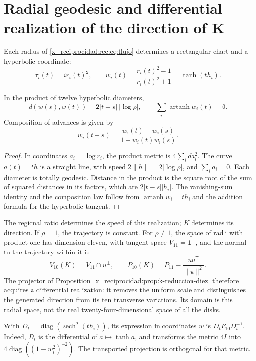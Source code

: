 \section{Radial geodesic and differential realization of the direction of K}

Each radius of \eqref{x_reciprocidad:rec:eq:flujo} determines a rectangular chart and a hyperbolic coordinate:
\[
 \tau_i(t)=ir_i(t)^2,\qquad
 w_i(t)=\frac{r_i(t)^2-1}{r_i(t)^2+1}=\tanh(th_i).
\]

\begin{theorem}
\label{x_reciprocidad:rec:thm:geodesica}
In the product of twelve hyperbolic diameters,
\begin{equation}
 d(w(s),w(t))=2|t-s|\,|\log\rho|,\qquad
 \sum_i\operatorname{artanh}w_i(t)=0.
 \label{x_reciprocidad:rec:eq:geodesica}
\end{equation}
Composition of advances is given by
\[
 w_i(t+s)=\frac{w_i(t)+w_i(s)}{1+w_i(t)w_i(s)}.
\]
\end{theorem}
\begin{proof}
In coordinates \(a_i=\log r_i\), the product metric is \(4\sum_i da_i^2\). The curve \(a(t)=th\) is a straight line, with speed \(2\|h\|=2|\log\rho|\), and \(\sum_i a_i=0\). Each diameter is totally geodesic. Distance in the product is the square root of the sum of squared distances in its factors, which are \(2|t-s||h_i|\). The vanishing-sum identity and the composition law follow from \(\operatorname{artanh}w_i=th_i\) and the addition formula for the hyperbolic tangent.
\end{proof}

The regional ratio determines the speed of this realization; \(K\) determines its direction. If \(\rho=1\), the trajectory is constant. For \(\rho\ne1\), the space of radii with product one has dimension eleven, with tangent space \(V_{11}=\mathbf1^\perp\), and the normal to the trajectory within it is
\[
 V_{10}(K)=V_{11}\cap u^\perp,\qquad
 P_{10}(K)=P_{11}-\frac{uu^{\mathsf T}}{\|u\|^2}.
\]
The projector of Proposition~\ref{x_reciprocidad:prop:k-reduccion-diez} therefore acquires a differential realization: it removes the uniform scale and distinguishes the generated direction from its ten transverse variations. Its domain is this radial space, not the real twenty-four-dimensional space of all the disks.

With \(D_t=\operatorname{diag}(\operatorname{sech}^2(th_i))\), its expression in coordinates \(w\) is \(D_tP_{10}D_t^{-1}\). Indeed, \(D_t\) is the differential of \(a\mapsto\tanh a\), and transforms the metric \(4I\) into \(4\operatorname{diag}((1-w_i^2)^{-2})\). The transported projection is orthogonal for that metric.

